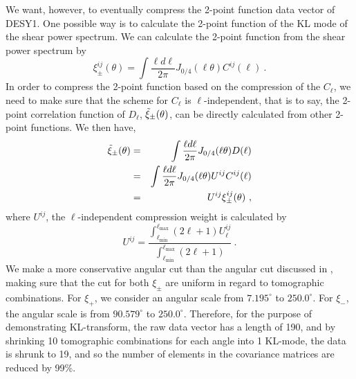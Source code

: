 \documentclass[twocolumn]{\docclass}
\newcommand\be{\begin{equation}}
\newcommand\ee{\end{equation}}
\def\bea{\begin{eqnarray}}
\def\eea{\end{eqnarray}}
\def\svs{\nonumber\\}
\begin{document}
	We want, however, to eventually compress the 2-point function data vector of DESY1. One possible way is to calculate the 2-point function of the KL mode of the shear power spectrum. We can calculate the 2-point function from the shear power spectrum by
	\be
	\xi_{\pm}^{ij}(\theta) = \int \frac{\ell d \ell }{2\pi}J_{0/4}(\ell \theta) C^{ij}(\ell)\
	.\ee
	In order to compress the 2-point function based on the compression of the $C_{\ell}$, we need to make sure that the scheme for $C_{\ell}$ is $\ell$-independent, that is to say, the 2-point correlation function of $D_{\ell}$, $\Tilde{\xi}_{\pm}(\theta)$, can be directly calculated from other 2-point functions. We then have,
	\bea
	\nonumber\Tilde{\xi}_{\pm}(\theta) &=& \int \frac{\ell d \ell }{2\pi}J_{0/4}(\ell \theta) D(\ell)\\\nonumber
	&=&\int \frac{\ell d \ell }{2\pi}J_{0/4}(\ell \theta) U^{ij}C^{ij}(\ell)\\
	&=&U^{ij}\xi_{\pm}^{ij}(\theta)\
	,\eea
	where $U^{ij}$, the $\ell$-independent compression weight is calculated by 
	\be
	U^{ij} = \frac{\int_{\ell _{\mathrm{min}}}^{\ell _{\mathrm{max}}} (2 \ell +1) U^{ij}_{\ell}}{\int_{\ell _{\mathrm{min}}}^{\ell _{\mathrm{max}}} (2 \ell +1)}\
	.\ee
	We make a more conservative angular cut than the angular cut discussed in \cite{Troxel:2017xyo}, making sure that the cut for both $\xi_{\pm}$ are uniform in regard to tomographic combinations. For $\xi_+$, we consider an angular scale from $7.195^{\circ}$ to $250.0^{\circ}$. For $\xi_-$, the angular scale is from $90.579^{\circ}$ to $250.0^{\circ}$. Therefore, for the purpose of demonstrating KL-transform, the raw data vector has a length of 190, and by shrinking 10 tomographic combinations for each angle into 1 KL-mode, the data is shrunk to 19, and so the number of elements in the covariance matrices are reduced by 99\%.
	
	
\end{document}
